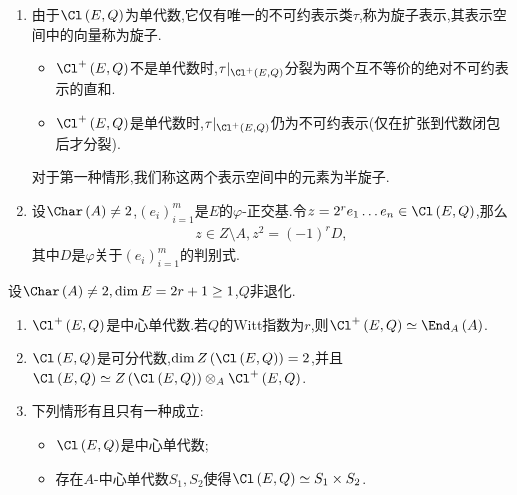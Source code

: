 \begin{remark}{}{}
	\begin{enumerate}
		\item 由于$\Cl\left(E,Q\right)$为单代数,它仅有唯一的不可约表示类$\tau$,称为旋子表示,其表示空间中的向量称为旋子.
		\begin{itemize}
			\item $\Cl^{+}\left(E,Q\right)$不是单代数时,$\tau|_{\Cl^{+}\left(E,Q\right)}$分裂为两个互不等价的绝对不可约表示的直和.
			\item $\Cl^{+}\left(E,Q\right)$是单代数时,$\tau|_{\Cl^{+}\left(E,Q\right)}$仍为不可约表示(仅在扩张到代数闭包后才分裂).
		\end{itemize}
		对于第一种情形,我们称这两个表示空间中的元素为半旋子.
		\item 设$\Char\left(A\right)\neq 2$,$\left(e_{i}\right)_{i=1}^{m}$是$E$的$\varphi$-正交基.令$z=2^{r}e_{1}\ldots e_{n}\in\Cl\left(E,Q\right)$,那么
		\begin{align*}
			z\in Z\setminus A,z^{2}=\left(-1\right)^{r}D,
		\end{align*}
		其中$D$是$\varphi$关于$\left(e_{i}\right)_{i=1}^{m}$的判别式.
	\end{enumerate}
\end{remark}

\begin{theorem}{}{}
	设$\Char\left(A\right)\neq 2,\dim E=2r+1\geq 1$,$Q$非退化.
	\begin{enumerate}
		\item $\Cl^{+}\left(E,Q\right)$是中心单代数.若$Q$的Witt指数为$r$,则$\Cl^{+}\left(E,Q\right)\simeq\End_{A}\left(A\right)$.
		\item $\Cl\left(E,Q\right)$是可分代数,$\dim Z\left(\Cl\left(E,Q\right)\right)=2$,并且$\Cl\left(E,Q\right)\simeq Z\left(\Cl\left(E,Q\right)\right)\otimes_{A}\Cl^{+}\left(E,Q\right)$.
		\item 下列情形有且只有一种成立:
		\begin{itemize}
			\item $\Cl\left(E,Q\right)$是中心单代数;
			\item 存在$A$-中心单代数$S_{1},S_{2}$使得$\Cl\left(E,Q\right)\simeq S_{1}\times S_{2}$.
		\end{itemize}
	\end{enumerate}
\end{theorem}

